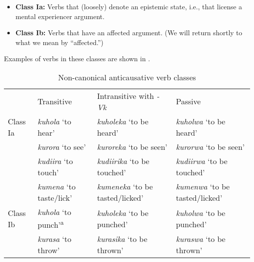 \documentclass[output=paper]{langsci/langscibook}
\begin{document}
\begin{itemize}
 \item \textbf{Class Ia:} Verbs that (loosely) denote an epistemic state, i.e., that license a mental experiencer argument.
 \item \textbf{Class Ib:} Verbs that have an affected argument. (We will return shortly to what we mean by “affected.”)

\end{itemize}



Examples of verbs in these classes are shown in .

\begin{table}
\caption{Non-canonical anticausative verb classes}
\label{tab:gluckman:4}

\begin{tabularx}{\textwidth}{lp{2.5cm}XX} & {Transitive} & {Intransitive with} {\textit{-Vk}} & {Passive}\\
\lsptoprule
{Class Ia} & \textit{kuhola} \newline ‘to hear’ & \textit{kuholeka} \newline ‘to be heard’ & \textit{kuholwa} \newline ‘to be heard’\\
& \textit{kurora} \newline ‘to see’ & \textit{kuroreka} \newline ‘to be seen’ & \textit{kurorwa} \newline ‘to be seen’\\
\tablevspace & \textit{kudiira} \newline ‘to touch’ & \textit{kudiirika} \newline ‘to be touched’ & \textit{kudiirwa} \newline ‘to be touched’\\
\tablevspace & \textit{kumena} \newline ‘to taste/lick’ & \textit{kumeneka} \newline ‘to be tasted/licked’ & \textit{kumenwa} \newline ‘to be tasted/licked’\\
\midrule
{Class Ib} & \textit{kuhola} \newline ‘to punch’\textsuperscript{a} & \textit{kuholeka} \newline ‘to be punched’ & \textit{kuholwa} \newline ‘to be punched’\\
& \textit{kurasa} \newline ‘to throw’ & \textit{kurasika} \newline ‘to be thrown’ & \textit{kuraswa} \newline ‘to be thrown’\\

\end{tabularx}
\end{table}
\end{document}

